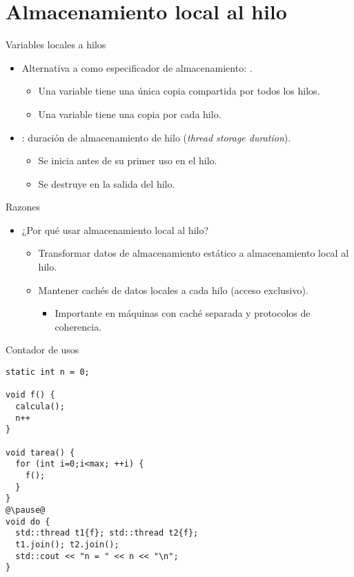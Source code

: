 \section{Almacenamiento local al hilo}

\begin{frame}[t]{Variables locales a hilos}
\begin{itemize}
  \item Alternativa a  como especificador de almacenamiento: .
    \begin{itemize}
      \item Una variable  tiene una única copia compartida por todos los hilos.
      \item Una variable  tiene una copia por cada hilo.
    \end{itemize}

  \item {}: duración de almacenamiento de hilo (\emph{thread storage duration}).
    \begin{itemize}
      \item Se inicia antes de su primer uso en el hilo.
      \item Se destruye en la salida del hilo.
    \end{itemize}
\end{itemize}
\end{frame}

\begin{frame}[t]{Razones}
\begin{itemize}
  \item ¿Por qué usar almacenamiento local al hilo?
    \begin{itemize}
      \item Transformar datos de almacenamiento estático a almacenamiento local al hilo.
      \item Mantener cachés de datos locales a cada hilo (acceso exclusivo).
        \begin{itemize}
          \item Importante en máquinas con caché separada y protocolos de coherencia.
        \end{itemize}
    \end{itemize}
\end{itemize}
\end{frame}

\begin{frame}[t,fragile]{Contador de usos}
\begin{lstlisting}[escapechar=@]
static int n = 0;

void f() {
  calcula();
  n++
}

void tarea() {
  for (int i=0;i<max; ++i) {
    f();
  }
}
@\pause@
void do {
  std::thread t1{f}; std::thread t2{f};
  t1.join(); t2.join();
  std::cout << "n = " << n << "\n";
}
\end{lstlisting}
\end{frame}

